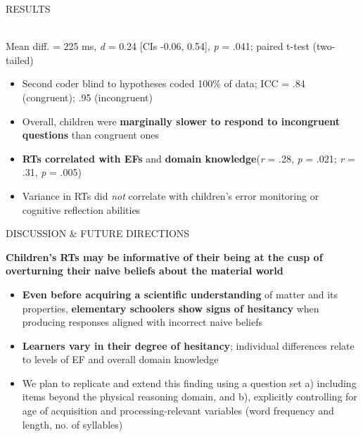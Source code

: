 \documentclass[final]{beamer}
\newlength{\colwidth}
\newlength{\widecolwidth}
\begin{document}
\begin{frame}[t]
\begin{columns}[t]
\begin{column}{\widecolwidth}
\begin{block}{RESULTS}
\begin{minipage}{0.45\textwidth}
\begin{figure}
\end{figure}
\\[2ex]
Mean diff. = 225 ms, \emph{d}  = 0.24 [CIs -0.06, 0.54], \emph{p} = .041; paired t-test (two-tailed)\\[2ex]
    \begin{itemize}
        \item Second coder blind to hypotheses coded 100\% of data; ICC = .84 (congruent); .95 (incongruent)
        \item Overall, children were \textbf{marginally slower to respond to incongruent questions} than congruent ones
        \item \textbf{RTs correlated with EFs} and \textbf{domain knowledge}\newline(\emph{r} = .28, \emph{p} = .021; \emph{r} = .31, \emph{p} = .005)
        \item Variance in RTs did \emph{not} correlate with children's error monitoring or cognitive reflection abilities
    \end{itemize}
\end{minipage}
\end{block}
    
\begin{block}{DISCUSSION \& FUTURE DIRECTIONS}
	\begin{tcolorbox}[
		colback=mycolor,
		colframe=mycolor,
		coltext=white,
		boxsep=2pt,
		left=2mm,
		right=2mm,
		top=2mm,
		bottom=2mm,
		arc=5mm,
		auto outer arc,
		boxrule=4pt,
		width=\dimexpr\linewidth-2\fboxsep\relax,
		]
		\centering
		\textbf{Children's RTs may be informative of their being at the cusp of overturning their naive beliefs about the material world}
	\end{tcolorbox}
	
    \begin{itemize}
      \item \textbf{Even before acquiring a scientific understanding} of matter and its properties, \textbf{elementary schoolers show signs of hesitancy} when producing responses aligned with incorrect naive beliefs
      \item \textbf{Learners vary in their degree of hesitancy}; individual differences relate to levels of EF and overall domain knowledge
      \item We plan to replicate and extend this finding using a question set a) including items beyond the physical reasoning domain, and b), explicitly controlling for age of acquisition and processing-relevant variables (word frequency and length, no. of syllables)
    \end{itemize}
\end{block}


\end{column}
\end{columns}
\end{frame}
\end{document}
